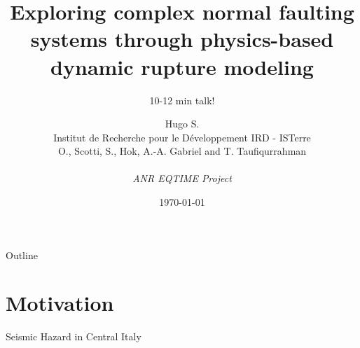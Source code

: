 \documentclass{beamer}
\title{{\normalsize \vskip 1cm Exploring complex normal faulting systems through physics-based dynamic rupture modeling}}
\subtitle{\small 10-12 min talk!}
\author{Hugo S. \\ {\tiny Institut de Recherche pour le Développement IRD - ISTerre} \\ 
O., Scotti, S., Hok, A.-A. Gabriel and T. Taufiqurrahman \\
\\
\textit{ANR EQTIME Project}
}
\date[2021]{\today}
\begin{document}

\begin{frame}
    \titlepage
\end{frame}

\begin{frame}
 {Outline}
 
 \tableofcontents
 
\end{frame}



\section{Motivation}


\begin{frame}
 {Seismic Hazard in Central Italy}
 

\end{frame}
\end{document}
